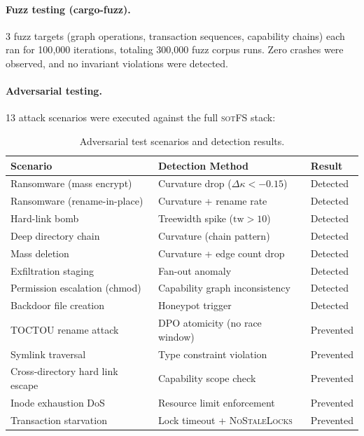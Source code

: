 \documentclass[11pt,a4paper]{article}
\theoremstyle{definition}
\theoremstyle{remark}
\newcommand{\sotfs}{\textsc{sotFS}}
\newcommand{\tw}{\ensuremath{\mathrm{tw}}}
\newcommand{\OR}{\ensuremath{\kappa}}  %
\begin{document}
\paragraph{Fuzz testing (cargo-fuzz).}
3 fuzz targets (graph operations, transaction sequences, capability
chains) each ran for 100{,}000 iterations, totaling 300{,}000 fuzz
corpus runs. Zero crashes were observed, and no invariant violations
were detected.

\paragraph{Adversarial testing.}
13 attack scenarios were executed against the full \sotfs{} stack:

\begin{table}[H]
\centering
\caption{Adversarial test scenarios and detection results.}
\label{tab:adversarial}
\small
\begin{tabular}{@{}lll@{}}
\toprule
\textbf{Scenario} & \textbf{Detection Method} & \textbf{Result} \\
\midrule
Ransomware (mass encrypt)        & Curvature drop ($\Delta\OR < -0.15$) & Detected \\
Ransomware (rename-in-place)     & Curvature + rename rate               & Detected \\
Hard-link bomb                   & Treewidth spike ($\tw > 10$)          & Detected \\
Deep directory chain             & Curvature (chain pattern)              & Detected \\
Mass deletion                    & Curvature + edge count drop            & Detected \\
Exfiltration staging             & Fan-out anomaly                        & Detected \\
Permission escalation (chmod)    & Capability graph inconsistency         & Detected \\
Backdoor file creation           & Honeypot trigger                       & Detected \\
TOCTOU rename attack             & DPO atomicity (no race window)         & Prevented \\
Symlink traversal                & Type constraint violation              & Prevented \\
Cross-directory hard link escape & Capability scope check                 & Prevented \\
Inode exhaustion DoS             & Resource limit enforcement             & Prevented \\
Transaction starvation           & Lock timeout + \textsc{NoStaleLocks}   & Prevented \\
\bottomrule
\end{tabular}
\end{table}
\end{document}

